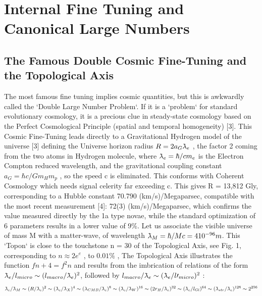 
\chapter{Internal Fine Tuning and Canonical Large Numbers}
\label{chap:chapter_1}


\section{The Famous Double Cosmic Fine-Tuning and the Topological Axis}
\label{sec:examples}

The most famous fine tuning implies cosmic quantities, but this is awkwardly called the `Double
Large Number Problem`. If it is a `problem` for standard evolutionary cosmology, it is a precious
clue in steady-state cosmology based on the Perfect Cosmological Principle (spatial and temporal
homogeneity) [3].
This Cosmic Fine-Tuning leads directly to a Gravitational Hydrogen model of the universe [3]
defining the Universe horizon radius $R = 2a_{G} \lambdabar_{e}$ , the factor 2 coming from the two atoms in
Hydrogen molecule, where $\lambdabar_{e} = \hbar/cm_{e}$ is the Electron Compton reduced wavelength, and the
gravitational coupling constant $a_{G} = \hbar c/Gm_{H} m_{p}$ , so the speed c is eliminated. This conforms with
Coherent Cosmology which needs signal celerity far exceeding c. This gives R = 13,812 Gly, corresponding to a Hubble constant 70.790 (km/s)/Megaparsec, compatible with the
most recent measurement [4]: 72(3) (km/s)/Megaparsec, which confirms the value measured
directly by the 1a type novae, while the standard optimization of 6 parameters results in a lower
value of 9\%.
Let us associate the visible universe of mass M with a matter-wave, of wavelength $\lambdabar_{M} = \hbar /Mc = 4
10^{-96} m$. This `Topon` is close to the touchstone n = 30 of the Topological Axis, see Fig. 1,
corresponding to $n \approx 2e^{e}$ , to $0.01\%$ , The Topological Axis illustrates the function $f{n + 4} = f^{2}{n}$
and results from the imbrication of relations of the form $\lambdabar_{e} /l_{micro} \sim (l_{macro} /\lambdabar_e )^{2} $, followed by $l_{macro} /\lambdabar_{e} \sim
(\lambdabar_{e} /l\prime_{micro} )^{2}$ :
$$\lambdabar_{e} /\lambdabar_{M} \sim (R/ \lambdabar_{e} )^{2} \sim ( \lambdabar_e / \lambdabar_X )^{4} \sim (\lambda_ {CMB} / \lambdabar_e )^{8} \sim ( \lambdabar_{e} / \lambdabar_{W} )^{16} \sim (2r_{H} / \lambdabar_{e} )^{32} \sim ( \lambdabar_{e} / l_{Gl} )^{64} \sim ( \lambdabar_{str} / \lambdabar_{e} )^{128} \sim 2^{256}$$

